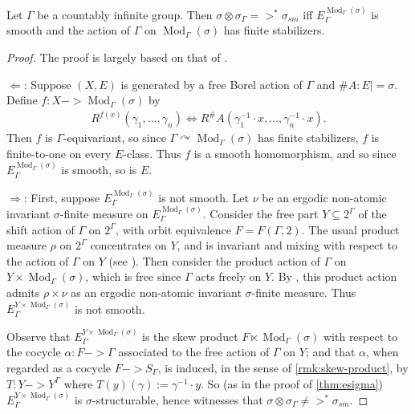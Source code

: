 \documentclass[11pt]{article}
\DeclareMathOperator\Mod{Mod}
\begin{document}
\begin{lemma}
\label{lm:modgamma-smooth}
Let $\Gamma$ be a countably infinite group.  Then $\sigma \otimes \sigma_\Gamma =>^* \sigma_{sm}$ iff $E_\Gamma^{\Mod_\Gamma(\sigma)}$ is smooth and the action of $\Gamma$ on $\Mod_\Gamma(\sigma)$ has finite stabilizers.
\end{lemma}
\begin{proof}
The proof is largely based on that of \cite[29.5]{KM}.

$\Longleftarrow$: Suppose $(X, E)$ is generated by a free Borel action of $\Gamma$ and $\#A : E |= \sigma$.  Define $f : X -> \Mod_\Gamma(\sigma)$ by
\begin{align*}
R^{f(x)}(\gamma_1, \dotsc, \gamma_n) \iff R^\#A(\gamma_1^{-1} \cdot x, \dotsc, \gamma_n^{-1} \cdot x).
\end{align*}
Then $f$ is $\Gamma$-equivariant, so since $\Gamma \curvearrowright \Mod_\Gamma(\sigma)$ has finite stabilizers, $f$ is finite-to-one on every $E$-class.  Thus $f$ is a smooth homomorphism, and so since $E_\Gamma^{\Mod_\Gamma(\sigma)}$ is smooth, so is $E$.

$\Longrightarrow$: First, suppose $E_\Gamma^{\Mod_\Gamma(\sigma)}$ is not smooth.  Let $\nu$ be an ergodic non-atomic invariant $\sigma$-finite measure on $E_\Gamma^{\Mod_\Gamma(\sigma)}$.  Consider the free part $Y \subseteq 2^\Gamma$ of the shift action of $\Gamma$ on $2^\Gamma$, with orbit equivalence $F = F(\Gamma, 2)$.  The usual product measure $\rho$ on $2^\Gamma$ concentrates on $Y$, and is invariant and mixing with respect to the action of $\Gamma$ on $Y$ (see \cite[3.1]{KM}).  Then consider the product action of $\Gamma$ on $Y \times \Mod_\Gamma(\sigma)$, which is free since $\Gamma$ acts freely on $Y$.  By \cite[2.3, 2.5]{SW}, this product action admits $\rho \times \nu$ as an ergodic non-atomic invariant $\sigma$-finite measure.  Thus $E_\Gamma^{Y \times \Mod_\Gamma(\sigma)}$ is not smooth.

Observe that $E_\Gamma^{Y \times \Mod_\Gamma(\sigma)}$ is the skew product $F \ltimes \Mod_\Gamma(\sigma)$ with respect to the cocycle $\alpha : F -> \Gamma$ associated to the free action of $\Gamma$ on $Y$; and that $\alpha$, when regarded as a cocycle $F -> S_\Gamma$, is induced, in the sense of \cref{rmk:skew-product}, by $T : Y -> Y^\Gamma$ where $T(y)(\gamma) := \gamma^{-1} \cdot y$.
So (as in the proof of \cref{thm:esigma}) $E_\Gamma^{Y \times \Mod_\Gamma(\sigma)}$ is $\sigma$-structurable, hence witnesses that $\sigma \otimes \sigma_\Gamma \not=>^* \sigma_{sm}$.


\end{proof}
\end{document}
